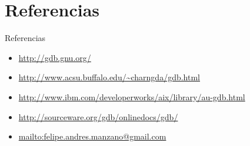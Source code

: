 \documentclass[xetex]{beamer}
\begin{document}
\section{Referencias}
\begin{frame}{Referencias}
\begin{itemize}
\item \url{http://gdb.gnu.org/}
\item \url{http://www.acsu.buffalo.edu/~charngda/gdb.html}
\item \url{http://www.ibm.com/developerworks/aix/library/au-gdb.html}
\item \url{http://sourceware.org/gdb/onlinedocs/gdb/}
\item \url{mailto:felipe.andres.manzano@gmail.com}
\end{itemize}
\end{frame}


{
\begin{frame}{}\end{frame}
}
\end{document}
